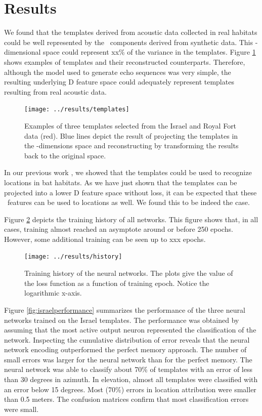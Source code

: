 \documentclass[preprint,5p]{elsarticle}
\begin{document}
\section{Results}

We found that the templates derived from acoustic data collected in real habitats could be well represented by the \pca\ components derived from synthetic data. This \pca-dimensional space could represent xx\% of the variance in the templates. Figure \ref{fig:templates} shows examples of templates and their reconstructed counterparts. Therefore, although the model used to generate echo sequences was very simple, the resulting underlying \pca D feature space could adequately represent templates resulting from real acoustic data.

\begin{figure}
	\centering
	\texttt{[image: ../results/templates]}
	\caption{Examples of three templates selected from the Israel and Royal Fort data (red). Blue lines depict the result of projecting the templates in the \pca-dimensions space and reconstructing by transforming the results back to the original space.}
	\label{fig:templates}
\end{figure}

In our previous work \cite{Vanderelst2016}, we showed that the templates could be used to recognize locations in bat habitats. As we have just shown that the templates can be projected into a lower \pca D feature space without loss, it can be expected that these \pca\ features can be used to locations as well. We found this to be indeed the case.

Figure \ref{fig:history} depicts the training history of all networks. This figure shows that, in all cases, training almost reached an asymptote around or before 250 epochs. However, some additional training can be seen up to xxx epochs.

\begin{figure}
	\centering
	\texttt{[image: ../results/history]}
	\caption{Training history of the neural networks. The plots give the value of the loss function as a function of training epoch. Notice the logarithmic x-axis.}
	\label{fig:history}
\end{figure}


Figure \ref{fig:israelperformance} summarizes the performance of the three neural networks trained on the Israel templates. The performance was obtained by assuming that the most active output neuron represented the classification of the network. Inspecting the cumulative distribution of error reveals that the neural network encoding outperformed the perfect memory approach. The number of small errors was larger for the neural network than for the perfect memory. The neural network was able to classify about 70\% of templates with an error of less than 30 degrees in azimuth. In elevation, almost all templates were classified with an error below 15 degrees. Most (70\%) errors in location attribution were smaller than 0.5 meters. The confusion matrices confirm that most classification errors were small.
\end{document}
